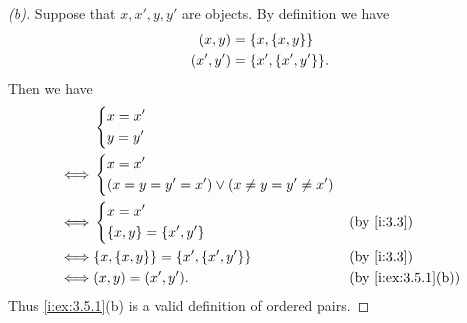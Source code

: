 \begin{proof}[(b)]
  Suppose that \(x, x', y, y'\) are objects.
  By definition we have
  \begin{align*}
    (x, y)   & = \set{x, \set{x, y}}     \\
    (x', y') & = \set{x', \set{x', y'}}.
  \end{align*}
  Then we have
  \begin{align*}
         & \begin{dcases}
             x = x' \\
             y = y'
           \end{dcases}                                                                \\
    \iff & \begin{dcases}
             x = x' \\
             \pa{x = y = y' = x'} \lor \pa{x \neq y = y' \neq x'}
           \end{dcases}                          \\
    \iff & \begin{dcases}
             x = x' \\
             \set{x, y} = \set{x', y'}
           \end{dcases}                            &  & \by{i:3.3}                      \\
    \iff & \set{x, \set{x, y}} = \set{x', \set{x', y'}}         &  & \by{i:3.3}         \\
    \iff & (x, y) = (x', y').                                   &  & \by{i:ex:3.5.1}[b]
  \end{align*}
  Thus \cref{i:ex:3.5.1}(b) is a valid definition of ordered pairs.
\end{proof}


